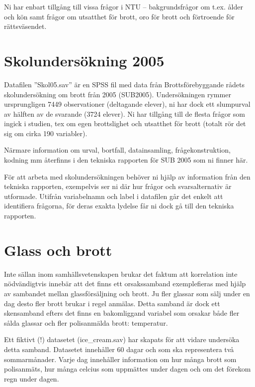 \documentclass[
]{book}
\begin{document}
Ni har enbart tillgång till vissa frågor i NTU -- bakgrundsfrågor om t.ex. ålder och kön samt
frågor om utsatthet för brott, oro för brott och förtroende för rättsväsendet.

\hypertarget{skolundersuxf6kning-2005}{%
\section{Skolundersökning 2005}\label{skolundersuxf6kning-2005}}

Datafilen ''Skol05.sav'' är en SPSS fil med data från Brottsförebyggande rådets
skolundersökning om brott från 2005 (SUB2005). Undersökningen rymmer ursprungligen 7449
observationer (deltagande elever), ni har dock ett slumpurval av hälften av de svarande (3724
elever). Ni har tillgång till de flesta frågor som ingick i studien, tex om egen brottslighet och
utsatthet för brott (totalt rör det sig om cirka 190 variabler).

Närmare information om urval, bortfall, datainsamling, frågekonstruktion, kodning mm återfinns
i den tekniska rapporten för SUB 2005 som ni finner här.

För att arbeta med skolundersökningen behöver ni hjälp av information från den tekniska
rapporten, exempelvis ser ni där hur frågor och svarsalternativ är utformade. Utifrån variabelnamn och label i datafilen går det enkelt att identifiera frågorna, för deras exakta
lydelse får ni dock gå till den tekniska rapporten.

\hypertarget{glass-och-brott}{%
\section{Glass och brott}\label{glass-och-brott}}

Inte sällan inom samhällsvetenskapen brukar det faktum att korrelation inte nödvändigtvis innebär att det finns ett orsakssamband exemplefieras med hjälp av sambandet mellan glassförsäljning och brott. Ju fler glassar som sälj under en dag desto fler brott brukar i regel anmälas. Detta samband är dock ett skensamband efters det finns en bakomliggand variabel som orsakar både fler sålda glassar och fler polisanmälda brott: temperatur.

Ett fiktivt (!) datasetet (ice\_cream.sav) har skapats för att vidare undersöka detta samband. Datasetet innehåller 60 dagar och som ska representera två sommarmånader. Varje dag innehåller information om hur många brott som polisanmäts, hur många celcius som uppmättes under dagen och om det förekom regn under dagen.
\end{document}
